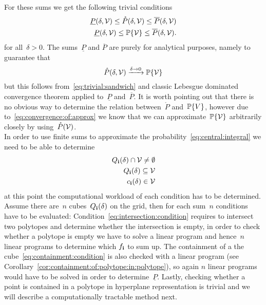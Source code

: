 %
For these sums we get the following trivial conditions
%
\begin{align}
\underline P(\delta,\mathcal V)\leq\mathring P (\delta,\mathcal V)\leq\overline P(\delta,\mathcal V)\label{eq:trivial:sandwich}\\
\underline P(\delta,\mathcal V)\leq\mathbb P\{\mathcal V\}\leq\overline P(\delta,\mathcal V)\label{eq:lebesgue:sandwich}.
\end{align}
%
for all~$\delta>0$.
%
The sums~$\underline P$ and $\overline P$ are purely for analytical purposes, namely to guarantee that 
%
\begin{equation}\label{eq:convergence:of:approx}
	\mathring P(\delta,\mathcal V)\xrightarrow{\delta\rightarrow0}\mathbb P\{\mathcal V\}
\end{equation}
%
but this follows from~\eqref{eq:trivial:sandwich} and classic Lebesgue dominated convergence theorem applied to~$\underline P$ and~$\overline P$.
%
It is worth pointing out that there is no obvious way to determine the relation between~$\mathring P$ and~$\mathbb P\{V\}$, however due to~\eqref{eq:convergence:of:approx} we know that we can approximate~$\mathbb P\{\mathcal V\}$ arbitrarily closely by using~$\mathring{P}(\mathcal V)$.
%
\\[1em]
%
\mysplit In order to use finite sums to approximate the probability~\eqref{eq:central:integral} we need to be able to determine
%
\begin{align}
	Q_{\mathbf{i}}(\delta)\cap\mathcal V\neq\emptyset\label{eq:intersection:condition}\\
	Q_{\mathbf{i}}(\delta)\subseteq\mathcal V\label{eq:containment:condition}\\
	c_{\mathbf{i}}(\delta)\in\mathcal V\label{eq:centre:condition}
\end{align}
%
at this point the computational workload of each condition has to be determined.
%
Assume there are~$n$ cubes~$Q_{\mathbf{i}}(\delta)$ on the grid, then for each sum~$n$ conditions have to be evaluated:
%
Condition~\eqref{eq:intersection:condition} requires to intersect two polytopes and determine whether the intersection is empty, in order to check whether a polytope is empty we have to solve a linear program and hence~$n$ linear programs to determine which $f_{\mathbf{i}}$ to sum up.
%
The containment of a the cube~\eqref{eq:containment:condition} is also checked with a linear program (see Corollary~\ref{cor:containment:of:polytope:in:polytope}), so again $n$ linear programs would have to be solved in order to determine~$\underline P$.
%
Lastly, checking whether a point is contained in a polytope in hyperplane representation is trivial and we will describe a computationally tractable method next.
